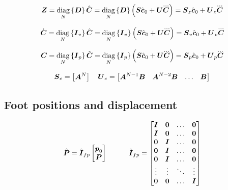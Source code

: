 \documentclass[12pt,a4paper]{article}
\begin{document}
\begin{equation*}
    \ZMP = 
        \diag{N}{\M{D}} \cState = 
        \diag{N}{\M{D}} \left(\M{S} \cstate_0  +  \M{U} \cJerk \right) = 
        \M{S}_z \cstate_0 + \M{U}_z \cJerk
\end{equation*}

\begin{equation*}
    \cVel = 
        \diag{N}{\M{I}_{v}} \cState = 
        \diag{N}{\M{I}_{v}} \left(\M{S} \cstate_0  +  \M{U} \cJerk \right) = 
        \M{S}_v \cstate_0 + \M{U}_v \cJerk
\end{equation*}

\begin{equation*}
    \cPos = 
        \diag{N}{\M{I}_{p}} \cState = 
        \diag{N}{\M{I}_{p}} \left(\M{S} \cstate_0  +  \M{U} \cJerk \right) = 
        \M{S}_{p} \cstate_0 + \M{U}_{p} \cJerk
\end{equation*}

\begin{equation*}
    \mbox{\boldmath $S$}_e =
        \begin{bmatrix}
        \mbox{\boldmath $A$}^{N}\\
        \end{bmatrix}
    \quad
    \mbox{\boldmath $U$}_e =
        \begin{bmatrix}
        \mbox{\boldmath $A$}^{N-1}\mbox{\boldmath $B$}    & \mbox{\boldmath $A$}^{N-2}\mbox{\boldmath $B$}  & \dots & \mbox{\boldmath $B$} \\
        \end{bmatrix}
\end{equation*}



\subsection{Foot positions and displacement}
\begin{equation*}
    \hat{\mbox{\boldmath $P$}} = \hat{\mbox{\boldmath $I$}}_{fp} 
    \begin{bmatrix}
        \mbox{\boldmath $p$}_0\\
        \mbox{\boldmath $P$}\\
    \end{bmatrix}
    \quad\quad\quad
    \hat{\mbox{\boldmath $I$}}_{fp} =
    \begin{bmatrix}
        \mbox{\boldmath $I$}   &   \mbox{\boldmath $0$}   &   \dots   &   \mbox{\boldmath $0$} \\
        \mbox{\boldmath $I$}   &   \mbox{\boldmath $0$}   &   \dots   &   \mbox{\boldmath $0$} \\
        \mbox{\boldmath $0$}   &   \mbox{\boldmath $I$}   &   \dots   &   \mbox{\boldmath $0$} \\
        \mbox{\boldmath $0$}   &   \mbox{\boldmath $I$}   &   \dots   &   \mbox{\boldmath $0$} \\
        \mbox{\boldmath $0$}   &   \mbox{\boldmath $I$}   &   \dots   &   \mbox{\boldmath $0$} \\
        \vdots  &   \vdots  &   \ddots  &   \vdots \\
        \mbox{\boldmath $0$}   &   \mbox{\boldmath $0$}   &   \dots   &   \mbox{\boldmath $I$} \\
    \end{bmatrix}
\end{equation*}
\end{document}
